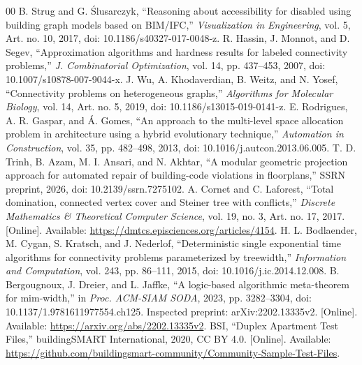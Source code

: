\documentclass[conference]{IEEEtran}
\begin{document}
\clearpage
\begin{thebibliography}{00}
 B. Strug and G. \'{S}lusarczyk, ``Reasoning about accessibility for disabled using building graph models based on BIM/IFC,'' \emph{Visualization in Engineering}, vol. 5, Art. no. 10, 2017, doi: 10.1186/s40327-017-0048-z.
 R. Hassin, J. Monnot, and D. Segev, ``Approximation algorithms and hardness results for labeled connectivity problems,'' \emph{J. Combinatorial Optimization}, vol. 14, pp. 437--453, 2007, doi: 10.1007/s10878-007-9044-x.
 J. Wu, A. Khodaverdian, B. Weitz, and N. Yosef, ``Connectivity problems on heterogeneous graphs,'' \emph{Algorithms for Molecular Biology}, vol. 14, Art. no. 5, 2019, doi: 10.1186/s13015-019-0141-z.
 E. Rodrigues, A. R. Gaspar, and \'{A}. Gomes, ``An approach to the multi-level space allocation problem in architecture using a hybrid evolutionary technique,'' \emph{Automation in Construction}, vol. 35, pp. 482--498, 2013, doi: 10.1016/j.autcon.2013.06.005.
 T. D. Trinh, B. Azam, M. I. Ansari, and N. Akhtar, ``A modular geometric projection approach for automated repair of building-code violations in floorplans,'' SSRN preprint, 2026, doi: 10.2139/ssrn.7275102.
 A. Cornet and C. Laforest, ``Total domination, connected vertex cover and Steiner tree with conflicts,'' \emph{Discrete Mathematics \& Theoretical Computer Science}, vol. 19, no. 3, Art. no. 17, 2017. [Online]. Available: \url{https://dmtcs.episciences.org/articles/4154}.
 H. L. Bodlaender, M. Cygan, S. Kratsch, and J. Nederlof, ``Deterministic single exponential time algorithms for connectivity problems parameterized by treewidth,'' \emph{Information and Computation}, vol. 243, pp. 86--111, 2015, doi: 10.1016/j.ic.2014.12.008.
 B. Bergougnoux, J. Dreier, and L. Jaffke, ``A logic-based algorithmic meta-theorem for mim-width,'' in \emph{Proc. ACM-SIAM SODA}, 2023, pp. 3282--3304, doi: 10.1137/1.9781611977554.ch125. Inspected preprint: arXiv:2202.13335v2. [Online]. Available: \url{https://arxiv.org/abs/2202.13335v2}.
 BSI, ``Duplex Apartment Test Files,'' buildingSMART International, 2020, CC BY 4.0. [Online]. Available: \url{https://github.com/buildingsmart-community/Community-Sample-Test-Files}.


\end{thebibliography}
\end{document}
